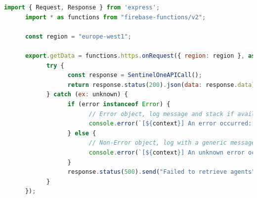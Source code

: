 \begin{lstlisting}[language=JavaScript, caption=Example of a typical onRequest function]
      import { Request, Response } from 'express';
      import * as functions from "firebase-functions/v2";

      const region = "europe-west1";

      export.getData = functions.https.onRequest({ region: region }, async (request: Request, response: Response): Promise<any> => {
            try {
                  const response = SentinelOneAPICall();
                  return response.status(200).json(data: response.data);
            } catch (ex: unknown) {
                  if (error instanceof Error) {
                        // Error object, log message and stack if available
                        console.error(`[${context}] An error occurred: ${error.message} \n Stack: ${error.stack}`);
                  } else {
                        // Non-Error object, log with a generic message.
                        console.error(`[${context}] An unknown error occurred:`, error);
                  }
                  response.status(500).send("Failed to retrieve agents");
            }
      });
\end{lstlisting}

